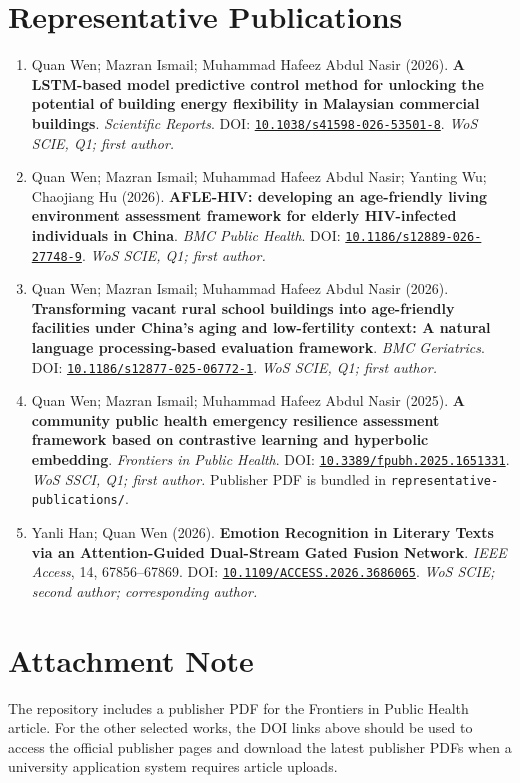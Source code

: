 \documentclass[11pt,a4paper]{article}
\newcommand{\doi}[1]{\href{https://doi.org/#1}{\nolinkurl{#1}}}
\begin{document}
\section*{Representative Publications}
\begin{enumerate}
  \item Quan Wen; Mazran Ismail; Muhammad Hafeez Abdul Nasir (2026). \textbf{A LSTM-based model predictive control method for unlocking the potential of building energy flexibility in Malaysian commercial buildings}. \textit{Scientific Reports}. DOI: \doi{10.1038/s41598-026-53501-8}. \textit{WoS SCIE, Q1; first author.}

  \item Quan Wen; Mazran Ismail; Muhammad Hafeez Abdul Nasir; Yanting Wu; Chaojiang Hu (2026). \textbf{AFLE-HIV: developing an age-friendly living environment assessment framework for elderly HIV-infected individuals in China}. \textit{BMC Public Health}. DOI: \doi{10.1186/s12889-026-27748-9}. \textit{WoS SCIE, Q1; first author.}

  \item Quan Wen; Mazran Ismail; Muhammad Hafeez Abdul Nasir (2026). \textbf{Transforming vacant rural school buildings into age-friendly facilities under China's aging and low-fertility context: A natural language processing-based evaluation framework}. \textit{BMC Geriatrics}. DOI: \doi{10.1186/s12877-025-06772-1}. \textit{WoS SCIE, Q1; first author.}

  \item Quan Wen; Mazran Ismail; Muhammad Hafeez Abdul Nasir (2025). \textbf{A community public health emergency resilience assessment framework based on contrastive learning and hyperbolic embedding}. \textit{Frontiers in Public Health}. DOI: \doi{10.3389/fpubh.2025.1651331}. \textit{WoS SSCI, Q1; first author.} Publisher PDF is bundled in \nolinkurl{representative-publications/}.

  \item Yanli Han; Quan Wen (2026). \textbf{Emotion Recognition in Literary Texts via an Attention-Guided Dual-Stream Gated Fusion Network}. \textit{IEEE Access}, 14, 67856--67869. DOI: \doi{10.1109/ACCESS.2026.3686065}. \textit{WoS SCIE; second author; corresponding author.}
\end{enumerate}

\section*{Attachment Note}
The repository includes a publisher PDF for the Frontiers in Public Health article. For the other selected works, the DOI links above should be used to access the official publisher pages and download the latest publisher PDFs when a university application system requires article uploads.
\end{document}
